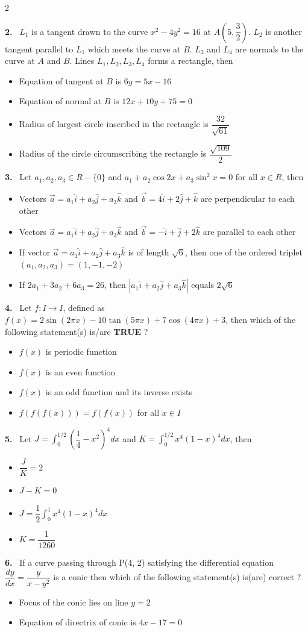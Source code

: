 \documentclass[10pt]{extarticle}
\newcommand{\qn}[1]{\par\smallskip\noindent\textbf{#1.}~}
\newenvironment{qoptions}{\begin{itemize}[leftmargin=1.8em,itemsep=1pt,topsep=2pt,label={}]}{\end{itemize}}
\newcommand{\opt}[2]{\item[(#1)] #2}
\begin{document}
\begin{multicols}{2}
\begin{qoptions}
\end{qoptions}
\qn{2} $L_1$ is a tangent drawn to the curve $x^2-4y^2=16$ at $A\left(5,\dfrac32\right)$. $L_2$ is another tangent parallel to $L_1$ which meets the curve at $B$. $L_3$ and $L_4$ are normals to the curve at $A$ and $B$. Lines $L_1,L_2,L_3,L_4$ forms a rectangle, then
\begin{qoptions}
\opt{A}{Equation of tangent at $B$ is $6y=5x-16$}
\opt{B}{Equation of normal at $B$ is $12x+10y+75=0$}
\opt{C}{Radius of largest circle inscribed in the rectangle is $\dfrac{32}{\sqrt{61}}$}
\opt{D}{Radius of the circle circumscribing the rectangle is $\dfrac{\sqrt{109}}{2}$}
\end{qoptions}
\qn{3} Let $a_1,a_2,a_3\in R-\{0\}$ and $a_1+a_2\cos2x+a_3\sin^2x=0$ for all $x\in R$, then
\begin{qoptions}
\opt{A}{Vectors $\vec a=a_1\hat i+a_2\hat j+a_3\hat k$ and $\vec b=4\hat i+2\hat j+\hat k$ are perpendicular to each other}
\opt{B}{Vectors $\vec a=a_1\hat i+a_2\hat j+a_3\hat k$ and $\vec b=-\hat i+\hat j+2\hat k$ are parallel to each other}
\opt{C}{If vector $\vec a=a_1\hat i+a_2\hat j+a_3\hat k$ is of length $\sqrt6$, then one of the ordered triplet $(a_1,a_2,a_3)=(1,-1,-2)$}
\opt{D}{If $2a_1+3a_2+6a_3=26$, then $\left|a_1\hat i+a_2\hat j+a_3\hat k\right|$ equals $2\sqrt6$}
\end{qoptions}
\qn{4} Let $f:I\rightarrow I$, defined as $f(x)=2\sin(2\pi x)-10\tan(5\pi x)+7\cos(4\pi x)+3$, then which of the following statement(s) is/are \textbf{TRUE} ?\par
[\textbf{Note:} $I$ denote the set of all integers]
\begin{qoptions}
\opt{A}{$f(x)$ is periodic function}
\opt{B}{$f(x)$ is an even function}
\opt{C}{$f(x)$ is an odd function and its inverse exists}
\opt{D}{$f(f(f(x)))=f(f(x))$ for all $x\in I$}
\end{qoptions}
\qn{5} Let $J=\displaystyle\int_0^{1/2}\left(\dfrac14-x^2\right)^4dx$ and $K=\displaystyle\int_0^{1/2}x^4(1-x)^4dx$, then
\begin{qoptions}
\opt{A}{$\dfrac JK=2$}
\opt{B}{$J-K=0$}
\opt{C}{$J=\dfrac12\displaystyle\int_0^1x^4(1-x)^4dx$}
\opt{D}{$K=\dfrac{1}{1260}$}
\end{qoptions}
\qn{6} If a curve passing through P(4, 2) satisfying the differential equation $\dfrac{dy}{dx}=\dfrac{y}{x-y^2}$ is a conic then which of the following statement(s) is(are) correct ?
\begin{qoptions}
\opt{A}{Focus of the conic lies on line $y=2$}
\opt{B}{Equation of directrix of conic is $4x-17=0$}

\end{qoptions}
\end{multicols}
\end{document}
